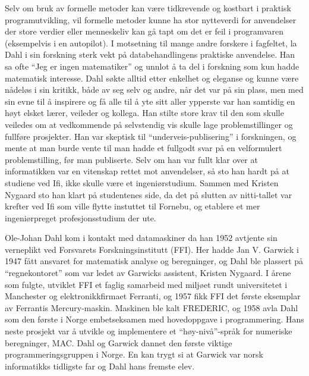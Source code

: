 Selv om bruk av formelle metoder kan være tidkrevende og kostbart i praktisk programutvikling, vil formelle metoder kunne ha stor nytteverdi for anvendelser der store verdier eller menneskeliv kan gå tapt om det er feil i programvaren (eksempelvis i en autopilot). I motsetning til mange andre forskere i fagfeltet, la Dahl i sin forskning sterk vekt på databehandlingens praktiske anvendelse. Han sa ofte ``Jeg er ingen matematiker'' og unnlot å ta del i forskning som kun hadde matematisk interesse. Dahl søkte alltid etter enkelhet og eleganse og kunne være nådeløs i sin kritikk, både av seg selv og andre, når det var på sin plass, men med sin evne til å inspirere og få alle til å yte sitt aller ypperste var han samtidig en høyt elsket lærer, veileder og kollega. Han stilte store krav til den som skulle veiledes om at vedkommende på selvstendig vis skulle lage problemstillinger og fullføre prosjekter. Han var skeptisk til ``underveis-publisering'' i forskningen, og mente at man burde vente til man hadde et fullgodt svar på en velformulert problemstilling, før man publiserte. Selv om han var fullt klar over at informatikken var en vitenskap rettet mot anvendelser, så sto han hardt på at studiene ved Ifi, ikke skulle være et ingeniørstudium. Sammen med Kristen Nygaard sto han klart på studentenes side, da det på slutten av nitti-tallet var krefter ved Ifi som ville flytte instuttet til Fornebu, og etablere et mer ingeniørpreget profesjonsstudium der ute.

Ole-Johan Dahl kom i kontakt med datamaskiner da han 1952 avtjente sin verneplikt ved Forsvarets Forskningsinstitutt (FFI). Her hadde Jan V. Garwick i 1947 fått ansvaret for matematisk analyse og beregninger, og Dahl ble plassert på ``regnekontoret'' som var ledet av Garwicks assistent, Kristen Nygaard. I årene som fulgte, utviklet FFI et faglig samarbeid med miljøet rundt universitetet i Manchester og elektronikkfirmaet Ferranti, og 1957 fikk FFI det første eksemplar av Ferrantis Mercury-maskin. Maskinen ble kalt FREDERIC, og 1958 avla Dahl som den første i Norge embetseksamen med hovedoppgave i programmering. Hans neste prosjekt var å utvikle og implementere et ``høy-nivå''-språk for numeriske beregninger, MAC. Dahl og Garwick dannet den første viktige programmeringsgruppen i Norge. En kan trygt si at Garwick var norsk informatikks tidligste far og Dahl hans fremste elev.

